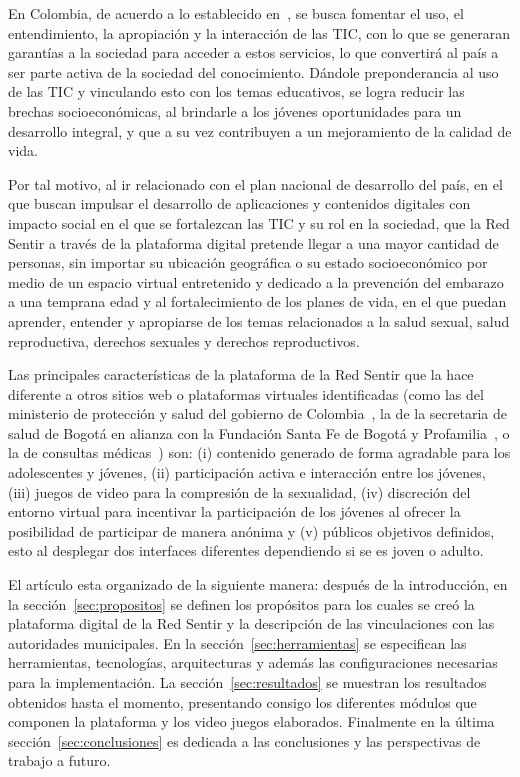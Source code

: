 \documentclass[a4paper]{article}
\begin{document}
En Colombia, de acuerdo a lo establecido en~\citep{Plan2014}, se busca fomentar el uso, el entendimiento, la apropiación y la interacción de las TIC, con lo que se generaran garantías a la sociedad para acceder a estos servicios, lo que convertirá al país a ser parte activa de la sociedad del conocimiento. Dándole preponderancia al uso de las TIC y vinculando esto con los temas educativos, se logra reducir las brechas socioeconómicas, al brindarle a los jóvenes oportunidades para un desarrollo integral, y que a su vez contribuyen a un mejoramiento de la calidad de vida.

Por tal motivo, al ir relacionado con el plan nacional de desarrollo del país, en el que buscan impulsar el desarrollo de aplicaciones y contenidos digitales con impacto social en el que se fortalezcan las TIC y su rol en la sociedad, que la Red Sentir a través de la plataforma digital pretende llegar a una mayor cantidad de personas, sin importar su ubicación geográfica o su estado socioeconómico por medio de un espacio virtual entretenido y dedicado a la prevención del embarazo a una temprana edad y al fortalecimiento de los planes de vida, en el que puedan aprender, entender y apropiarse de los temas relacionados a la salud sexual, salud reproductiva, derechos sexuales y derechos reproductivos.

Las principales características de la plataforma de la Red Sentir que la hace diferente a otros sitios web o plataformas virtuales identificadas (como las del ministerio de protección y salud del gobierno de Colombia~\citep{PagGob2018}, la de la secretaria de salud de Bogotá en alianza con la Fundación Santa Fe de Bogotá y Profamilia~\citep{Sexperto2018}, o la de consultas médicas~\citep{1DOC3}) son: (i) contenido generado de forma agradable para los adolescentes y jóvenes, (ii) participación activa e interacción entre los jóvenes, (iii) juegos de video para la compresión de la sexualidad, (iv) discreción del entorno virtual para incentivar la participación de los jóvenes al ofrecer la posibilidad de participar de manera anónima y (v) públicos objetivos definidos, esto al desplegar dos interfaces diferentes dependiendo si se es joven o adulto.  

El artículo esta organizado de la siguiente manera: después de la introducción, en la sección~\ref{sec:propositos} se definen los propósitos para los cuales se creó la plataforma digital de la Red Sentir y la descripción de las vinculaciones con las autoridades municipales. En la sección~\ref{sec:herramientas} se especifican las herramientas, tecnologías, arquitecturas y además las configuraciones necesarias para la implementación. La sección~\ref{sec:resultados} se muestran los resultados obtenidos hasta el momento, presentando consigo los diferentes módulos que componen la plataforma y los video juegos elaborados. Finalmente en la última sección~\ref{sec:conclusiones} es dedicada a las conclusiones y las perspectivas de trabajo a futuro.
\end{document}
